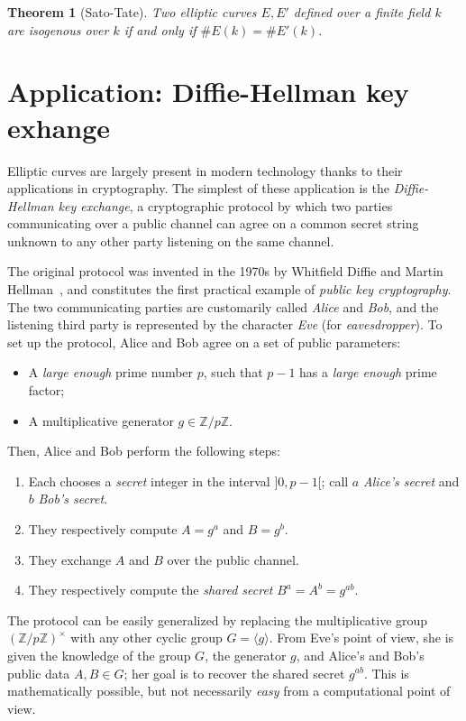 \documentclass[10pt]{article}
\theoremstyle{plain}
\newtheorem{theorem}{Theorem}
\theoremstyle{definition}
\begin{document}
\begin{theorem}[Sato-Tate]
  \label{th:sato-tate}
  Two elliptic curves $E,E'$ defined over a finite field $k$ are
  isogenous over $k$ if and only if $\#E(k)=\#E'(k)$.
\end{theorem}


\section{Application: Diffie-Hellman key exhange}
\label{sec:appl-diff-hellm}

Elliptic curves are largely present in modern technology thanks to
their applications in cryptography. %
The simplest of these application is the \emph{Diffie-Hellman key
  exchange}, a cryptographic protocol by which two parties
communicating over a public channel can agree on a common secret
string unknown to any other party listening on the same channel.

The original protocol was invented in the 1970s by Whitfield Diffie
and Martin Hellman~\cite{dh}, and constitutes the first practical
example of \emph{public key cryptography}. %
The two communicating parties are customarily called \emph{Alice} and
\emph{Bob}, and the listening third party is represented by the
character \emph{Eve} (for \emph{eavesdropper}). %
To set up the protocol, Alice and Bob agree on a set of public
parameters:
\begin{itemize}
\item A \emph{large enough} prime number $p$, such that $p-1$ has a
  \emph{large enough} prime factor;
\item A multiplicative generator $g∈ℤ/pℤ$.
\end{itemize}

Then, Alice and Bob perform the following steps:
\begin{enumerate}
\item Each chooses a \emph{secret} integer in the interval $]0,p-1[$;
  call $a$ \emph{Alice's secret} and $b$ \emph{Bob's secret}.
\item They respectively compute $A=g^a$ and $B=g^b$.
\item They exchange $A$ and $B$ over the public channel.
\item They respectively compute the \emph{shared secret}
  $B^a=A^b=g^{ab}$.
\end{enumerate}

The protocol can be easily generalized by replacing the multiplicative
group $(ℤ/pℤ)^{×}$ with any other cyclic group $G=〈g〉$. %
From Eve's point of view, she is given the knowledge of the group $G$,
the generator $g$, and Alice's and Bob's public data $A,B∈G$; her goal
is to recover the shared secret $g^{ab}$. %
This is mathematically possible, but not necessarily \emph{easy} from
a computational point of view.
\end{document}
